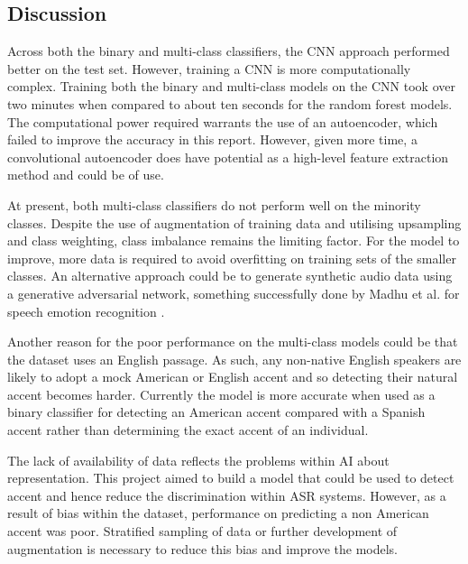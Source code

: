 \documentclass[conference]{IEEEtran}
\begin{document}
\subsection{Discussion}
Across both the binary and multi-class classifiers, the CNN approach performed better on the test set. However, training a CNN is more computationally complex. Training both the binary and multi-class models on the CNN took over two minutes when compared to about ten seconds for the random forest models. The computational power required warrants the use of an autoencoder, which failed to improve the accuracy in this report. However, given more time, a convolutional autoencoder does have potential as a high-level feature extraction method and could be of use.

At present, both multi-class classifiers do not perform well on the minority classes. Despite the use of augmentation of training data and utilising upsampling and class weighting, class imbalance remains the limiting factor. For the model to improve, more data is required to avoid overfitting on training sets of the smaller classes. An alternative approach could be to generate synthetic audio data using a generative adversarial network, something successfully done by Madhu et al. for speech emotion recognition \cite{madhu2019data}. 

Another reason for the poor performance on the multi-class models could be that the dataset uses an English passage. As such, any non-native English speakers are likely to adopt a mock American or English accent and so detecting their natural accent becomes harder. Currently the model is more accurate when used as a binary classifier for detecting an American accent compared with a Spanish accent rather than determining the exact accent of an individual.

The lack of availability of data reflects the problems within AI about representation. This project aimed to build a model that could be used to detect accent and hence reduce the discrimination within ASR systems. However, as a result of bias within the dataset, performance on predicting a non American accent was poor. Stratified sampling of data or further development of augmentation is necessary to reduce this bias and improve the models. 
\end{document}
